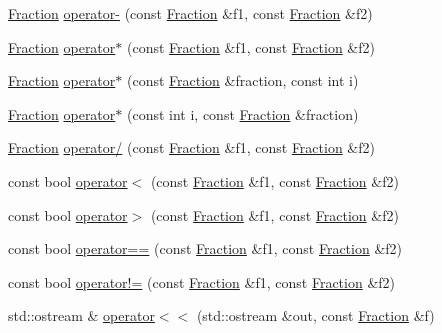 \begin{DoxyCompactItemize}
\item 
\hyperlink{classprism_1_1_fraction}{Fraction} \hyperlink{namespaceprism_a2daf470e5f35f8450447deb2634c22c1}{operator-\/} (const \hyperlink{classprism_1_1_fraction}{Fraction} \&f1, const \hyperlink{classprism_1_1_fraction}{Fraction} \&f2)
\item 
\hyperlink{classprism_1_1_fraction}{Fraction} \hyperlink{namespaceprism_ac4f48e3429a86bafcc7c21a2bd6a7ae1}{operator$\ast$} (const \hyperlink{classprism_1_1_fraction}{Fraction} \&f1, const \hyperlink{classprism_1_1_fraction}{Fraction} \&f2)
\item 
\hyperlink{classprism_1_1_fraction}{Fraction} \hyperlink{namespaceprism_a1f5007702b28b447f62c3b9df62f2aa4}{operator$\ast$} (const \hyperlink{classprism_1_1_fraction}{Fraction} \&fraction, const int i)
\item 
\hyperlink{classprism_1_1_fraction}{Fraction} \hyperlink{namespaceprism_af1ff5871f65565a84b886c5013bcd50a}{operator$\ast$} (const int i, const \hyperlink{classprism_1_1_fraction}{Fraction} \&fraction)
\item 
\hyperlink{classprism_1_1_fraction}{Fraction} \hyperlink{namespaceprism_a7ba7b5cc9750f0d6cda50f0cb874da6f}{operator/} (const \hyperlink{classprism_1_1_fraction}{Fraction} \&f1, const \hyperlink{classprism_1_1_fraction}{Fraction} \&f2)
\item 
const bool \hyperlink{namespaceprism_a105ac9995ade66ebb2a039ef90751c7a}{operator$<$} (const \hyperlink{classprism_1_1_fraction}{Fraction} \&f1, const \hyperlink{classprism_1_1_fraction}{Fraction} \&f2)
\item 
const bool \hyperlink{namespaceprism_a7122a7ff43fc6aba9cef9d31fe8c7559}{operator$>$} (const \hyperlink{classprism_1_1_fraction}{Fraction} \&f1, const \hyperlink{classprism_1_1_fraction}{Fraction} \&f2)
\item 
const bool \hyperlink{namespaceprism_a5b9e84008b9eaa99d29d4b74cd150cd8}{operator==} (const \hyperlink{classprism_1_1_fraction}{Fraction} \&f1, const \hyperlink{classprism_1_1_fraction}{Fraction} \&f2)
\item 
const bool \hyperlink{namespaceprism_aea72179b12983e614f72acd2b3cbf0e0}{operator!=} (const \hyperlink{classprism_1_1_fraction}{Fraction} \&f1, const \hyperlink{classprism_1_1_fraction}{Fraction} \&f2)
\item 
std\+::ostream \& \hyperlink{namespaceprism_a9c2d182a77a92e6cba7917dbd58f9d87}{operator$<$$<$} (std\+::ostream \&out, const \hyperlink{classprism_1_1_fraction}{Fraction} \&f)
\item 

\end{DoxyCompactItemize}
